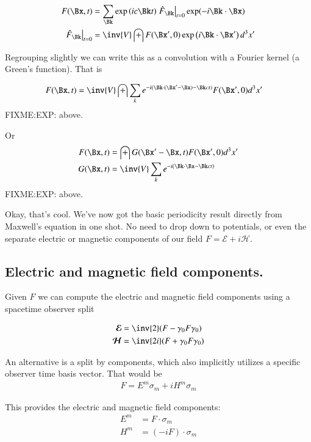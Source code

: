 \documentclass{article}
\newcommand{\EE}[0]{\boldsymbol{\mathcal{E}}}
\newcommand{\HH}[0]{\boldsymbol{\mathcal{H}}}
\begin{document}
\begin{align}
F(\Bx,t) &= \sum_{\Bk} \exp\left(i c \Bk t \right) {\left.\hat{F}_{\Bk}\right\vert}_{t=0} \exp(-i \Bk \cdot \Bx) \\
{\left.\hat{F}_{\Bk}\right\vert}_{t=0} &= \inv{V} \int F(\Bx', 0) \exp\left( i\Bk \cdot \Bx' \right) d^3 x'
\end{align}

Regrouping slightly we can write this as a convolution with a Fourier kernel (a Green's function).  That is

\begin{align}
F(\Bx,t) &= \inv{V} \int \sum_k e^{ - i (\Bk \cdot (\Bx' - \Bx) - \Bk c t) } F(\Bx', 0) d^3 x'
\end{align}
FIXME:EXP: above.

Or
\begin{align}\label{eqn:bivectorSolution}
F(\Bx,t) &= \int G(\Bx' - \Bx, t) F(\Bx', 0) d^3 x' \\
G(\Bx,t) &= \inv{V} \sum_k e^{ - i (\Bk \cdot \Bx - \Bk c t) }
\end{align}
FIXME:EXP: above.

Okay, that's cool.  We've now got the basic periodicity result directly from Maxwell's equation in one shot.  No need to drop down to
potentials, or even the separate electric or magnetic components of our field $F = \EE + i \HH$.

\subsection{ Electric and magnetic field components. }

Given $F$ we can compute the electric and magnetic field components using a spacetime observer split

\begin{align*}
\EE &= \inv{2}(F - \gamma_0 F \gamma_0 ) \\
\HH &= \inv{2i}(F + \gamma_0 F \gamma_0 ) \\
\end{align*}

An alternative is a split by components, which also implicitly utilizes
a specific observer time basis vector.  That would be
\begin{align*}
F = E^m \sigma_m + i H^m \sigma_m
\end{align*}

This provides the electric and magnetic field components:
\begin{align*}
E^m &= F \cdot \sigma_m \\
H^m &= (-i F) \cdot \sigma_m
\end{align*}
\end{document}
